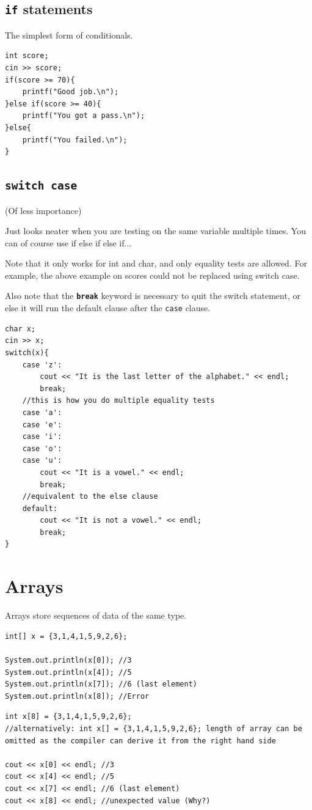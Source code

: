 \subsection{\texttt{if} statements}

The simplest form of conditionals.

\begin{lstlisting}
int score;
cin >> score;
if(score >= 70){
    printf("Good job.\n");
}else if(score >= 40){
    printf("You got a pass.\n");
}else{
    printf("You failed.\n");
}
\end{lstlisting}

\subsection{\texttt{switch case}} 

{\footnotesize (Of less importance)}

Just looks neater when you are testing on the same variable multiple times. You can of course use if else if else if... 

Note that it only works for int and char, and only equality tests are allowed. For example, the above example on scores could not be replaced using switch case.

Also note that the \textbf{\texttt{break}} keyword is necessary to quit the switch statement, or else it will run the default clause after the \texttt{case} clause.

\begin{lstlisting}
char x;
cin >> x;
switch(x){
    case 'z':
        cout << "It is the last letter of the alphabet." << endl;
        break;
    //this is how you do multiple equality tests
    case 'a':
    case 'e':
    case 'i':
    case 'o':
    case 'u':
        cout << "It is a vowel." << endl;
        break;
    //equivalent to the else clause
    default:
        cout << "It is not a vowel." << endl;
        break;
}
\end{lstlisting}


\section{Arrays}
\label{sec:arrayintro}
Arrays store sequences of data of the same type.

\if{}
\begin{lstlisting}
int[] x = {3,1,4,1,5,9,2,6};

System.out.println(x[0]); //3 
System.out.println(x[4]); //5
System.out.println(x[7]); //6 (last element)
System.out.println(x[8]); //Error 
\end{lstlisting}
\else
\begin{lstlisting}
int x[8] = {3,1,4,1,5,9,2,6};
//alternatively: int x[] = {3,1,4,1,5,9,2,6}; length of array can be omitted as the compiler can derive it from the right hand side

cout << x[0] << endl; //3 
cout << x[4] << endl; //5
cout << x[7] << endl; //6 (last element)
cout << x[8] << endl; //unexpected value (Why?)
\end{lstlisting}
\fi

